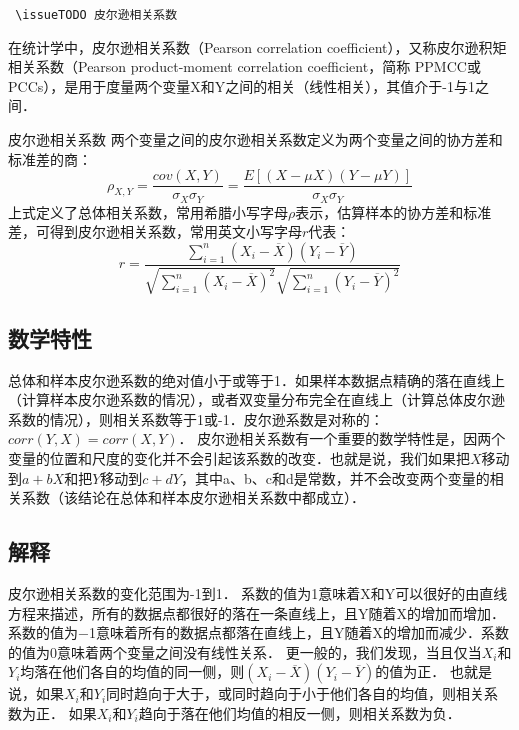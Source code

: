 
\verb | \issueTODO 皮尔逊相关系数|

在统计学中，皮尔逊相关系数（Pearson correlation coefficient），又称皮尔逊积矩相关系数（Pearson product-moment correlation coefficient，简称 PPMCC或PCCs），是用于度量两个变量X和Y之间的相关（线性相关），其值介于-1与1之间．
\begin{definition}{皮尔逊相关系数}\label{PearsR_def1}
两个变量之间的皮尔逊相关系数定义为两个变量之间的协方差和标准差的商：
\begin{equation}
\rho_{X,Y}=\frac{cov(X,Y)}{\sigma_{X}\sigma_{Y}}=\frac{E[(X-\mu X)(Y-\mu Y)]}{\sigma_{X}\sigma_{Y}}
\end{equation}
上式定义了总体相关系数，常用希腊小写字母$\rho$表示，估算样本的协方差和标准差，可得到皮尔逊相关系数，常用英文小写字母$r$代表：
\begin{equation}
r=\frac{\sum_{i=1}^n\left(X_i-\overline X\right)\left(Y_i-\overline Y\right)}{\sqrt{\sum_{i=1}^n\left(X_i-\overline X\right)^2}\sqrt{\sum_{i=1}^n\left(Y_i-\overline Y\right)^2}}
\end{equation}
\end{definition}
\subsection{数学特性}
总体和样本皮尔逊系数的绝对值小于或等于1．如果样本数据点精确的落在直线上（计算样本皮尔逊系数的情况），或者双变量分布完全在直线上（计算总体皮尔逊系数的情况），则相关系数等于1或-1．皮尔逊系数是对称的： $corr(Y,X)=corr(X,Y)$．
皮尔逊相关系数有一个重要的数学特性是，因两个变量的位置和尺度的变化并不会引起该系数的改变．也就是说，我们如果把$X$移动到$a+bX$和把$Y$移动到$c+dY$，其中a、b、c和d是常数，并不会改变两个变量的相关系数（该结论在总体和样本皮尔逊相关系数中都成立）．
\subsection{解释}
皮尔逊相关系数的变化范围为-1到1． 系数的值为1意味着X和Y可以很好的由直线方程来描述，所有的数据点都很好的落在一条直线上，且Y随着X的增加而增加．系数的值为−1意味着所有的数据点都落在直线上，且Y随着X的增加而减少．系数的值为0意味着两个变量之间没有线性关系．
更一般的，我们发现，当且仅当$X_i$和$Y_i$均落在他们各自的均值的同一侧，则$(X_i-\overline X)(Y_i-\overline Y)$的值为正． 也就是说，如果$X_i$和$Y_i$同时趋向于大于，或同时趋向于小于他们各自的均值，则相关系数为正． 如果$X_i$和$Y_i$趋向于落在他们均值的相反一侧，则相关系数为负．